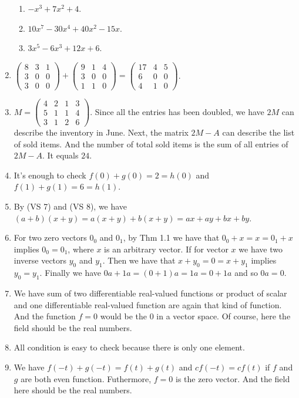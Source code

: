 \begin{enumerate}
\begin{enumerate}
\item $-x^3+7x^2+4$.
\item $10x^7-30x^4+40x^2-15x$.
\item $3x^5-6x^3+12x+6$.
\end{enumerate}
\item \(
\left(\begin{array}{ccc}
8& 3& 1\\
3& 0& 0\\
3& 0& 0
\end{array}\right)
+
\left(\begin{array}{ccc}
9& 1& 4\\
3& 0& 0\\
1& 1& 0
\end{array}\right)
=
\left(\begin{array}{ccc}
17& 4& 5\\
6& 0& 0\\
4& 1& 0
\end{array}\right)\).
\item \(M=\left(\begin{array}{cccc}4&2&1&3\\5&1&1&4\\3&1&2&6\end{array}\right)\). Since all the entries has been doubled, we have $2M$ can describe the inventory in June. Next, the matrix $2M-A$ can describe the list of sold items. And the number of total sold items is the sum of all entries of $2M-A$. It equals $24$.
\item It's enough to check $f(0)+g(0)=2=h(0)$ and $f(1)+g(1)=6=h(1)$.
\item By (VS 7) and (VS 8), we have $(a+b)(x+y)=a(x+y)+b(x+y)=ax+ay+bx+by$.
\item For two zero vectors $0_0$ and $0_1$, by Thm 1.1 we have that $0_0+x=x=0_1+x$ implies $0_0=0_1$, where $x$ is an arbitrary vector. If for vector $x$ we have two inverse vectors $y_0$ and $y_1$. Then we have that $x+y_0=0=x+y_1$ implies $y_0=y_1$. Finally we have $0a+1a=(0+1)a=1a=0+1a$ and so $0a=0$.
\item We have sum of two differentiable real-valued functions or product of scalar and one differentiable real-valued function are again that kind of function. And the function $f=0$ would be the $0$ in a vector space. Of course, here the field should be the real numbers.
\item All condition is easy to check because there is only one element.
\item We have $f(-t)+g(-t)=f(t)+g(t)$ and $cf(-t)=cf(t)$ if $f$ and $g$ are both even function. Futhermore, $f=0$ is the zero vector. And the field here should be the real numbers.

\end{enumerate}
